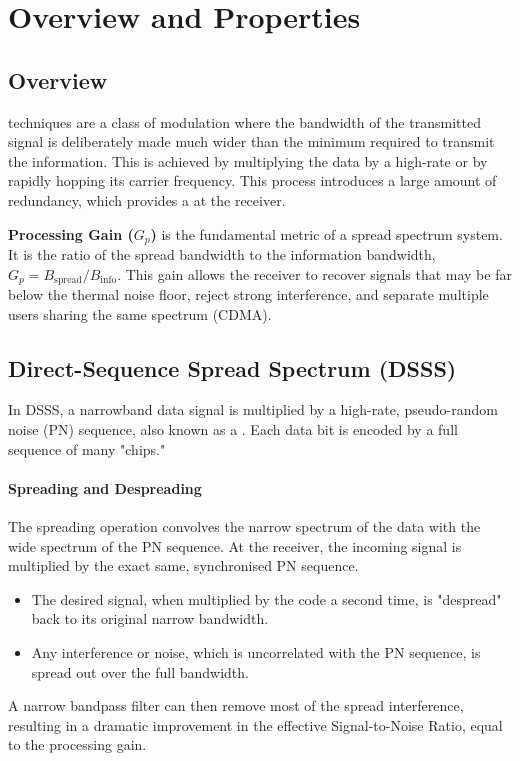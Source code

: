 \section{Overview and Properties}

\subsection{Overview}

 techniques are a class of modulation where the bandwidth of the transmitted signal is deliberately made much wider than the minimum required to transmit the information. This is achieved by multiplying the data by a high-rate  or by rapidly hopping its carrier frequency. This process introduces a large amount of redundancy, which provides a  at the receiver.

\begin{keyconcept}
    \textbf{Processing Gain ($G_p$)} is the fundamental metric of a spread spectrum system. It is the ratio of the spread bandwidth to the information bandwidth, $G_p = B_{\text{spread}} / B_{\text{info}}$. This gain allows the receiver to recover signals that may be far below the thermal noise floor, reject strong interference, and separate multiple users sharing the same spectrum (CDMA).
\end{keyconcept}


\subsection{Direct-Sequence Spread Spectrum (DSSS)}

In DSSS, a narrowband data signal is multiplied by a high-rate, pseudo-random noise (PN) sequence, also known as a . Each data bit is encoded by a full sequence of many "chips."

\paragraph{Spreading and Despreading}
The spreading operation convolves the narrow spectrum of the data with the wide spectrum of the PN sequence. At the receiver, the incoming signal is multiplied by the exact same, synchronised PN sequence.
\begin{itemize}
    \item The desired signal, when multiplied by the code a second time, is "despread" back to its original narrow bandwidth.
    \item Any interference or noise, which is uncorrelated with the PN sequence, is spread out over the full bandwidth.
\end{itemize}
A narrow bandpass filter can then remove most of the spread interference, resulting in a dramatic improvement in the effective Signal-to-Noise Ratio, equal to the processing gain.

